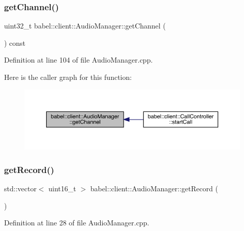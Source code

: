 \subsubsection{\texorpdfstring{get\+Channel()}{getChannel()}}
{\footnotesize\ttfamily uint32\+\_\+t babel\+::client\+::\+Audio\+Manager\+::get\+Channel (\begin{DoxyParamCaption}{ }\end{DoxyParamCaption}) const}



Definition at line 104 of file Audio\+Manager.\+cpp.

Here is the caller graph for this function\+:\nopagebreak
\begin{figure}[H]
\begin{center}
\leavevmode
\includegraphics[width=350pt]{classbabel_1_1client_1_1_audio_manager_a9d53c9ba60013ae16beee6e33147de81_icgraph}
\end{center}
\end{figure}
\mbox{\label{classbabel_1_1client_1_1_audio_manager_abe6f93340f16c366d6e2a447f8f32965}} 
\subsubsection{\texorpdfstring{get\+Record()}{getRecord()}}
{\footnotesize\ttfamily std\+::vector$<$ uint16\+\_\+t $>$ babel\+::client\+::\+Audio\+Manager\+::get\+Record (\begin{DoxyParamCaption}{ }\end{DoxyParamCaption})}



Definition at line 28 of file Audio\+Manager.\+cpp.

